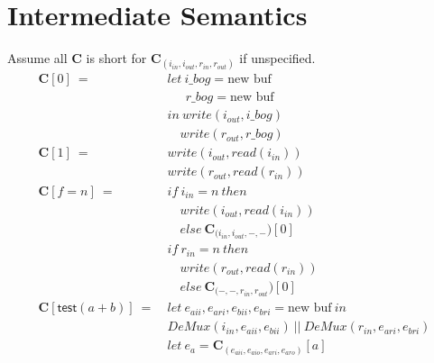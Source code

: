 \documentclass[12pt, letterpaper]{article}
\begin{document}
\section{Intermediate Semantics}
Assume all $\mathbf{C}$ is short for $\mathbf{C}_{(i_{in},i_{out},r_{in},r_{out})}$ if unspecified.
 {\fontsize{12pt}{14pt}\selectfont
     \begin{align*}
         \mathbf{C}[0]\ 
             =\ &
             let\ i\_bog = \text{new buf}\\
             &\quad\ \ r\_bog = \text{new buf}\\
             &in\ write(i_{out}, i\_bog)\\
             &\quad  write(r_{out}, r\_bog)\\
         \mathbf{C}[1]\ 
             =\ &
             write(i_{out}, read(i_{in}))\\
             &write(r_{out}, read(r_{in}))
             \\
         \mathbf{C}[f = n]\
            =\
            &if\ i_{in}=n\ then\\
            &\quad write(i_{out}, read(i_{in}))\\
            &\quad else\ \mathbf{C}_{(i_{in}, i_{out}, -, -})[0]\\
            &if\ r_{in}=n\ then\\
            &\quad write(r_{out}, read(r_{in}))\\
            &\quad else\ \mathbf{C}_{(-, -, r_{in}, r_{out}})[0]\\
         \mathbf{C}[\mathsf{test}(a + b)]\ 
             =\ &
             let\ e_{aii}, e_{ari}, e_{bii}, e_{bri} = \text{new buf}\ in\\
                &DeMux(i_{in}, e_{aii}, e_{bii})\ ||\ DeMux(r_{in}, e_{ari}, e_{bri})\\
             &let\ e_a = \mathbf{C}_{(e_{aii},e_{aio},e_{ari},e_{aro})}[a]\\

\end{align*}}
\end{document}
